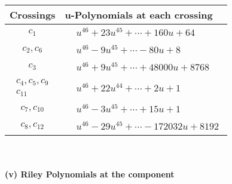 \documentclass[1p]{elsarticle_modified}
\theoremstyle{definition}
\begin{document}
\begin{tabular}{m{50pt}|m{274pt}}
Crossings & \hspace{64pt}u-Polynomials at each crossing \\
\hline $$\begin{aligned}c_{1}\end{aligned}$$&$\begin{aligned}
&u^{46}+23 u^{45}+\cdots+160 u+64
\end{aligned}$\\
\hline $$\begin{aligned}c_{2},c_{6}\end{aligned}$$&$\begin{aligned}
&u^{46}-9 u^{45}+\cdots-80 u+8
\end{aligned}$\\
\hline $$\begin{aligned}c_{3}\end{aligned}$$&$\begin{aligned}
&u^{46}+9 u^{45}+\cdots+48000 u+8768
\end{aligned}$\\
\hline $$\begin{aligned}c_{4},c_{5},c_{9}\\c_{11}\end{aligned}$$&$\begin{aligned}
&u^{46}+22 u^{44}+\cdots+2 u+1
\end{aligned}$\\
\hline $$\begin{aligned}c_{7},c_{10}\end{aligned}$$&$\begin{aligned}
&u^{46}-3 u^{45}+\cdots+15 u+1
\end{aligned}$\\
\hline $$\begin{aligned}c_{8},c_{12}\end{aligned}$$&$\begin{aligned}
&u^{46}-29 u^{45}+\cdots-172032 u+8192
\end{aligned}$\\
\hline
\end{tabular}\\~\\
\newpage\renewcommand{\arraystretch}{1}
\flushleft \textbf{(v) Riley Polynomials at the component}\newline \\
\end{document}
